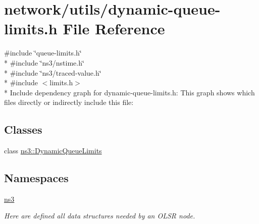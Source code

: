 \hypertarget{dynamic-queue-limits_8h}{}\section{network/utils/dynamic-\/queue-\/limits.h File Reference}
\label{dynamic-queue-limits_8h}
{\ttfamily \#include \char`\"{}queue-\/limits.\+h\char`\"{}}\\*
{\ttfamily \#include \char`\"{}ns3/nstime.\+h\char`\"{}}\\*
{\ttfamily \#include \char`\"{}ns3/traced-\/value.\+h\char`\"{}}\\*
{\ttfamily \#include $<$limits.\+h$>$}\\*
Include dependency graph for dynamic-\/queue-\/limits.h\+:
This graph shows which files directly or indirectly include this file\+:
\subsection*{Classes}
\begin{DoxyCompactItemize}
\item 
class \hyperlink{classns3_1_1DynamicQueueLimits}{ns3\+::\+Dynamic\+Queue\+Limits}
\end{DoxyCompactItemize}
\subsection*{Namespaces}
\begin{DoxyCompactItemize}
\item 
 \hyperlink{namespacens3}{ns3}
\begin{DoxyCompactList}\small\item\em Here are defined all data structures needed by an O\+L\+SR node. \end{DoxyCompactList}\end{DoxyCompactItemize}
